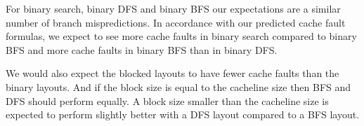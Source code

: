 For binary search, binary DFS and binary BFS our expectations are a similar number of branch mispredictions. In accordance with our predicted cache fault formulas, we expect to see more cache faults in binary search compared to binary BFS and more cache faults in binary BFS than in binary DFS.

We would also expect the blocked layouts to have fewer cache faults than the binary layouts. And if the block size is equal to the cacheline size then BFS and DFS should perform equally. A block size smaller than the cacheline size is expected to perform slightly better with a DFS layout compared to a BFS layout.


